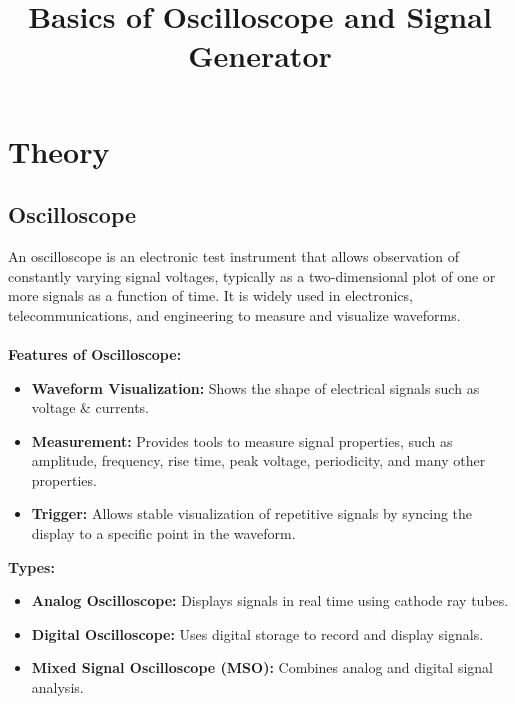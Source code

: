 \documentclass[12pt]{article}
\title{Basics of Oscilloscope and Signal Generator}
\author{}
\date{}
\begin{document}


\pagebreak

\tableofcontents

\pagebreak
{}
\maketitle

\section*{Theory}

\subsection*{Oscilloscope}
An oscilloscope is an electronic test instrument that allows observation of constantly varying signal voltages, typically as a two-dimensional plot of one or more signals as a function of time. It is widely used in electronics, telecommunications, and engineering to measure and visualize waveforms.\\\\
\textbf{Features of Oscilloscope:}
\begin{itemize}
    \item[] \textbf{Waveform Visualization:} Shows the shape of electrical signals such as voltage \& currents.
    \item[] \textbf{Measurement:} Provides tools to measure signal properties, such as amplitude, frequency, rise time, peak voltage, periodicity, and many other properties.
    \item[] \textbf{Trigger:} Allows stable visualization of repetitive signals by syncing the display to a specific point in the waveform.\\
\end{itemize}
\textbf{Types:}
\begin{itemize}
    \item[] \textbf{Analog Oscilloscope:} Displays signals in real time using cathode ray tubes.
    \item[] \textbf{Digital Oscilloscope:} Uses digital storage to record and display signals.
    \item[] \textbf{Mixed Signal Oscilloscope (MSO):} Combines analog and digital signal analysis.
\end{itemize}
\end{document}
